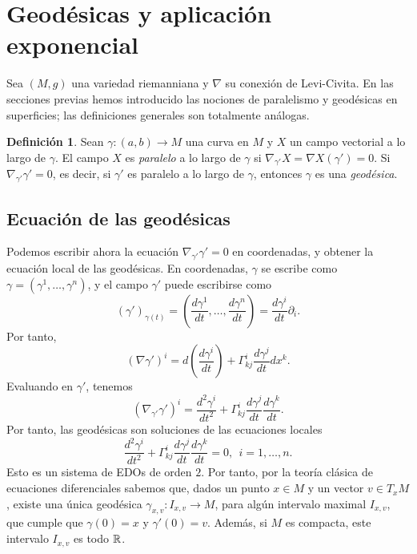 \documentclass[11pt,a4paper]{amsbook}
\theoremstyle{remark} \newtheorem{rmk}[subsection]{Observación}
\theoremstyle{definition} \newtheorem{defn}[subsection]{Definición}
\theoremstyle{definition} \newtheorem{ex}[subsection]{Ejemplo}
\theoremstyle{definition} \newtheorem{ej}[subsection]{Ejercicio}
\begin{document}
\section{Geodésicas y aplicación exponencial}
Sea $(M,g)$ una variedad riemanniana y $\nabla$ su conexión de Levi-Civita.  En las secciones previas hemos introducido las nociones de paralelismo y geodésicas en superficies; las definiciones generales son totalmente análogas.

\begin{defn}
  Sean $\gamma:(a,b)\rightarrow M$ una curva en $M$ y $X$ un campo vectorial a lo largo de $\gamma$. El campo $X$ es \emph{paralelo} a lo largo de $\gamma$ si $\nabla_{\gamma'} X=\nabla X (\gamma') = 0$. Si $\nabla_{\gamma'} \gamma'=0$, es decir, si $\gamma'$ es paralelo a lo largo de $\gamma$, entonces $\gamma$ es una \emph{geodésica}.
\end{defn}

\subsection{Ecuación de las geodésicas} Podemos escribir ahora la ecuación $\nabla_{\gamma'}\gamma'=0$ en coordenadas, y obtener la ecuación local de las geodésicas. En coordenadas, $\gamma$ se escribe como $\gamma=(\gamma^1,\dots,\gamma^n)$, y el campo $\gamma'$ puede escribirse como
\begin{equation*}
(\gamma')_{\gamma(t)} = \left(\frac{d\gamma^1}{dt},\dots,\frac{d\gamma^n}{dt}\right) = \frac{d\gamma^i}{dt} \partial_i.
\end{equation*}
Por tanto,
\begin{equation*}
(\nabla \gamma')^i = d\left(\frac{d\gamma^i}{dt} \right) +  \Gamma^i_{kj}\frac{d\gamma^j}{dt} dx^k.
\end{equation*}
Evaluando en $\gamma'$, tenemos
\begin{equation*}
(\nabla_{\gamma'} \gamma')^i = \frac{d^2 \gamma^i}{dt^2} +  \Gamma^i_{kj}\frac{d\gamma^j}{dt} \frac{d\gamma^k}{dt}.
\end{equation*}
Por tanto, las geodésicas son soluciones de las ecuaciones locales
\begin{equation*}
\frac{d^2 \gamma^i}{dt^2} + \Gamma^i_{kj}\frac{d\gamma^j}{dt} \frac{d\gamma^k}{dt} = 0, \ \ i=1,\dots,n.
\end{equation*}
Esto es un sistema de EDOs de orden $2$. Por tanto, por la teoría clásica de ecuaciones diferenciales sabemos que, dados un punto $x\in M$ y un vector $v\in T_xM$, existe una única geodésica $\gamma_{x,v}:I_{x,v}\rightarrow M$, para algún intervalo maximal $I_{x,v}$, que cumple que $\gamma(0)=x$ y $\gamma'(0)=v$. Además, si $M$ es compacta, este intervalo $I_{x,v}$ es todo $\mathbb R$.
\end{document}
